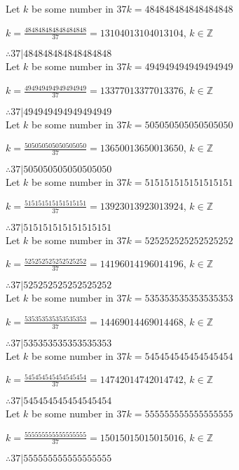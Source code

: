 \documentclass{article}
\begin{document}
Let $k$ be some number in $37k = 484848484848484848$

$k = \frac{484848484848484848}{37} = 13104013104013104$, $k \in \mathbb{Z}$

$ \therefore  37|484848484848484848 $ \\

Let $k$ be some number in $37k = 494949494949494949$

$k = \frac{494949494949494949}{37} = 13377013377013376$, $k \in \mathbb{Z}$

$ \therefore  37|494949494949494949 $ \\

Let $k$ be some number in $37k = 505050505050505050$

$k = \frac{505050505050505050}{37} = 13650013650013650$, $k \in \mathbb{Z}$

$ \therefore  37|505050505050505050 $ \\

Let $k$ be some number in $37k = 515151515151515151$

$k = \frac{515151515151515151}{37} = 13923013923013924$, $k \in \mathbb{Z}$

$ \therefore  37|515151515151515151 $ \\

Let $k$ be some number in $37k = 525252525252525252$

$k = \frac{525252525252525252}{37} = 14196014196014196$, $k \in \mathbb{Z}$

$ \therefore  37|525252525252525252 $ \\

Let $k$ be some number in $37k = 535353535353535353$

$k = \frac{535353535353535353}{37} = 14469014469014468$, $k \in \mathbb{Z}$

$ \therefore  37|535353535353535353 $ \\

Let $k$ be some number in $37k = 545454545454545454$

$k = \frac{545454545454545454}{37} = 14742014742014742$, $k \in \mathbb{Z}$

$ \therefore  37|545454545454545454 $ \\

Let $k$ be some number in $37k = 555555555555555555$

$k = \frac{555555555555555555}{37} = 15015015015015016$, $k \in \mathbb{Z}$

$ \therefore  37|555555555555555555 $ \\
\end{document}
